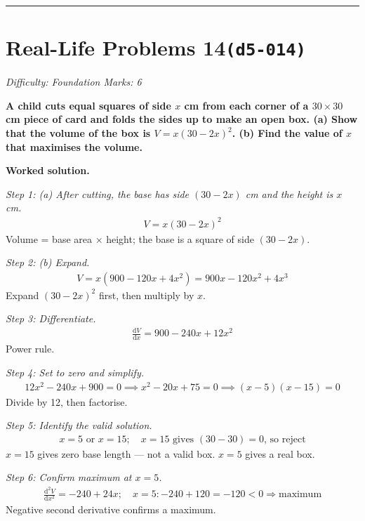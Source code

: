 \documentclass[11pt]{article}
\newcommand{\question}[1]{\par\medskip\noindent\textbf{#1}\par}
\begin{document}
\medskip\hrule

\section*{Real-Life Problems 14\quad\small\texttt{(d5-014)}}
\textit{Difficulty: Foundation \quad\textbar\quad Marks: 6}

\question{A child cuts equal squares of side \( x \) cm from each corner of a \( 30 \times 30 \) cm piece of card and folds the sides up to make an open box. (a) Show that the volume of the box is \( V = x(30 - 2x)^2 \). (b) Find the value of \( x \) that maximises the volume.}

\textbf{Worked solution.}

\textit{Step 1: (a) After cutting, the base has side \( (30 - 2x) \) cm and the height is \( x \) cm.}
\[\begin{gathered}
V = x(30 - 2x)^2
\end{gathered}\]
Volume = base area $\times$ height; the base is a square of side \( (30 - 2x) \).

\textit{Step 2: (b) Expand.}
\[\begin{gathered}
V = x(900 - 120x + 4x^2) = 900x - 120x^2 + 4x^3
\end{gathered}\]
Expand \( (30-2x)^2 \) first, then multiply by \( x \).

\textit{Step 3: Differentiate.}
\[\begin{gathered}
\frac{\mathrm{d}V}{\mathrm{d}x} = 900 - 240x + 12x^2
\end{gathered}\]
Power rule.

\textit{Step 4: Set to zero and simplify.}
\[\begin{gathered}
12x^2 - 240x + 900 = 0 \implies x^2 - 20x + 75 = 0 \implies (x-5)(x-15) = 0
\end{gathered}\]
Divide by 12, then factorise.

\textit{Step 5: Identify the valid solution.}
\[\begin{gathered}
x = 5 \text{ or } x = 15; \quad x = 15 \text{ gives } (30 - 30) = 0 \text{, so reject}
\end{gathered}\]
\( x = 15 \) gives zero base length --- not a valid box. \( x = 5 \) gives a real box.

\textit{Step 6: Confirm maximum at \( x = 5 \).}
\[\begin{gathered}
\frac{\mathrm{d}^2V}{\mathrm{d}x^2} = -240 + 24x; \quad x=5: -240+120 = -120 < 0 \Rightarrow \text{maximum}
\end{gathered}\]
Negative second derivative confirms a maximum.
\end{document}
